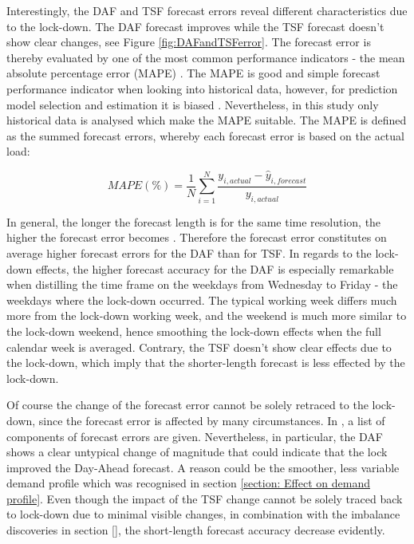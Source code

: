 \documentclass[energies,article,submit,moreauthors,pdftex]{Definitions/mdpi}
\begin{document}
Interestingly, the DAF and TSF forecast errors reveal different characteristics due to the lock-down. The DAF forecast improves while the TSF forecast doesn't show clear changes, see Figure \ref{fig:DAFandTSFerror}. The forecast error is thereby evaluated by one of the most common performance indicators - the mean absolute percentage error (MAPE) \cite{SahayDayNetwork, He2020Day-aheadForest}. The MAPE is good and simple forecast performance indicator when looking into historical data, however, for prediction model selection and estimation it is biased \cite{Tofallis2015AEstimation}. Nevertheless, in this study only historical data is analysed which make the MAPE suitable. The MAPE is defined as the summed forecast errors, whereby each forecast error is based on the actual load:

\[ MAPE(\%) = \frac{1}{N} \sum_{i=1}^N \frac{y_{i,actual} - \hat{y}_{i,forecast}}{y_{i,actual}} \]

In general, the longer the forecast length is for the same time resolution, the higher the forecast error becomes \cite{NationalgridESO2018QuarterlyMarch18}. Therefore the forecast error constitutes on average higher forecast errors for the DAF than for TSF. In regards to the lock-down effects, the higher forecast accuracy for the DAF is especially remarkable when distilling the time frame on the weekdays from Wednesday to Friday - the weekdays where the lock-down occurred. The typical working week differs much more from the lock-down working week, and the weekend is much more similar to the lock-down weekend, hence smoothing the lock-down effects when the full calendar week is averaged. Contrary, the TSF doesn't show clear effects due to the lock-down, which imply that the shorter-length forecast is less effected by the lock-down.

Of course the change of the forecast error cannot be solely retraced to the lock-down, since the forecast error is affected by many circumstances. In \cite{NationalgridESO2018QuarterlyMarch18}, a list of components of forecast errors are given. Nevertheless, in particular, the DAF shows a clear untypical change of magnitude that could indicate that the lock improved the Day-Ahead forecast. A reason could be the smoother, less variable demand profile which was recognised in section \ref{section: Effect on demand profile}. Even though the impact of the TSF change cannot be solely traced back to lock-down due to minimal visible changes, in combination with the imbalance discoveries in section \ref{}, the short-length forecast accuracy decrease evidently.
\end{document}
